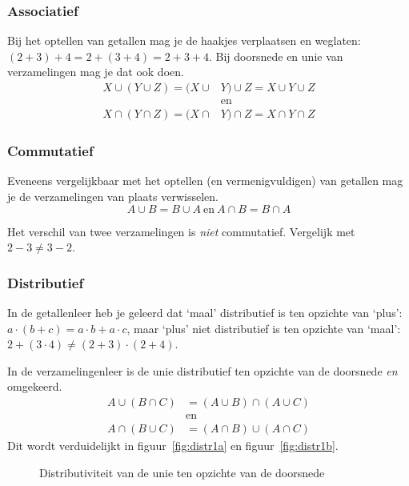 \subsubsection{Associatief}
Bij het optellen van getallen mag je de haakjes verplaatsen en weglaten:
$(2+3)+4=2+(3+4)=2+3+4$. Bij doorsnede en unie van verzamelingen mag je dat ook doen.
\begin{equation*}
\begin{split}
X\cup (Y\cup Z)=(X\cup &Y)\cup Z =X\cup Y\cup Z 
\\ &\mathrm{en}\\
X\cap (Y\cap Z)=(X\cap &Y)\cap Z = X\cap Y\cap Z
\end{split}
\end{equation*}
\subsubsection{Commutatief}
Eveneens vergelijkbaar met het optellen (en vermenigvuldigen) van getallen mag je de verzamelingen van plaats verwisselen.
\begin{equation*}
A\cup B=B\cup A ~\mathrm{en}~A\cap B=B\cap A
\end{equation*}

Het verschil van twee verzamelingen is \emph{niet} commutatief. Vergelijk met $2-3\not = 3-2$.

\subsubsection{Distributief}
In de getallenleer heb je geleerd dat `maal' distributief is ten opzichte van `plus': $a\cdot (b+c)=a\cdot b+a\cdot c$, maar `plus' niet distributief is ten opzichte van `maal': $2+(3\cdot 4)\not = (2+3)\cdot (2+4)$. 

In de verzamelingenleer is de unie distributief ten opzichte van de doorsnede \emph{en} omgekeerd. 
\begin{equation*}
\begin{split}
A\cup(B\cap C)&=(A\cup B) \cap (A\cup C) \\ &\mathrm{en} \\ A\cap(B\cup C)&=(A\cap B)\cup (A\cap C)
\end{split}
\end{equation*}
Dit wordt verduidelijkt in figuur~\ref{fig:distr1a} en figuur~\ref{fig:distr1b}. 

\begin{figure}[htbp]
\centering
{}\qquad
{}
\caption{Distributiviteit van de unie ten opzichte van de doorsnede}
\label{fig:distr1}
\end{figure}

